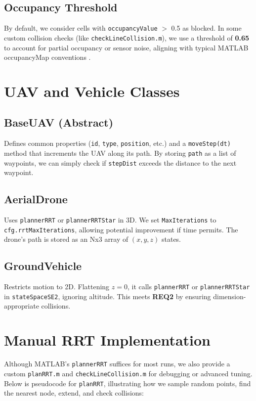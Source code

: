 \documentclass[12pt,a4paper]{report}
\begin{document}
\subsection*{Occupancy Threshold}
By default, we consider cells with \texttt{occupancyValue} $>$ 0.5 as blocked. In some 
custom collision checks (like \texttt{checkLineCollision.m}), we use a threshold of 
\textbf{0.65} to account for partial occupancy or sensor noise, aligning with typical 
MATLAB occupancyMap conventions \cite{Merei2025UAVObstacleSurvey}.

\section{UAV and Vehicle Classes}
\label{sec:uav_classes}

\subsection{BaseUAV (Abstract)}
Defines common properties (\texttt{id}, \texttt{type}, \texttt{position}, etc.) and a
\texttt{moveStep(dt)} method that increments the UAV along its path. By storing 
\texttt{path} as a list of waypoints, we can simply check if \texttt{stepDist} 
exceeds the distance to the next waypoint.

\subsection{AerialDrone}
Uses \texttt{plannerRRT} or \texttt{plannerRRTStar} in 3D. We set \texttt{MaxIterations}
to \texttt{cfg.rrtMaxIterations}, allowing potential improvement if time permits. The 
drone’s path is stored as an Nx3 array of \((x,y,z)\) states.

\subsection{GroundVehicle}
Restricts motion to 2D. Flattening $z=0$, it calls \texttt{plannerRRT} or 
\texttt{plannerRRTStar} in \texttt{stateSpaceSE2}, ignoring altitude. This meets 
\textbf{REQ2} by ensuring dimension-appropriate collisions.

\section{Manual RRT Implementation}
\label{sec:path_planning}
Although MATLAB’s \texttt{plannerRRT} suffices for most runs, we also provide a custom
\texttt{planRRT.m} and \texttt{checkLineCollision.m} for debugging or advanced 
tuning. Below is pseudocode for \texttt{planRRT}, illustrating how we sample random 
points, find the nearest node, extend, and check collisions:
\end{document}
